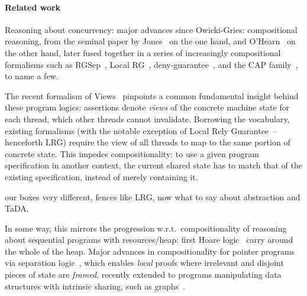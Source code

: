 

\paragraph{Related work}




Reasoning about concurrency: major advances since Owicki-Gries:
compositional reasoning, from the seminal paper by Jones~\cite{rg} on
the one hand, and O'Hearn~\cite{csl-orig,csl-tcs} on the other hand,
later fused together in a series of increasingly compositional
formalisms such as RGSep~\cite{viktor-marriage}, Local RG~\cite{lrg},
deny-guarantee~\cite{dg}, and the CAP
family~\cite{cap-ecoop10,icap,tada}, to name a few.


The recent formalism of Views~\cite{views} pinpoints a common
fundamental insight behind these program logics: assertions denote
\emph{views} of the concrete machine state for each thread, which
other threads cannot invalidate. Borrowing the vocabulary, existing
formalisms (with the notable exception of Local Rely
Guarantee~\cite{lrg}--henceforth LRG) require the view of all threads
to map to the same portion of concrete state. This impedes
compositionality: to use a given program specification in another
context, the current shared state has to match that of the existing
specification, instead of merely containing it. 


our boxes very different,  fences like LRG, now what to say about
abstraction and TaDA. 

In some way, this mirrors the progression w.r.t.\ compositionality of
reasoning about sequential programs with resources/heap: first Hoare
logic~\cite{hoarelogic} carry around the whole of the heap. Major
advances in compositionality for pointer programs via separation
logic~\cite{seplog}, which enables \emph{local} proofs where
irrelevant and disjoint pieces of state are \emph{framed}, recently
extended to programs manipulating data structures with intrinsic
sharing, such as graphs~\cite{ramification}.
